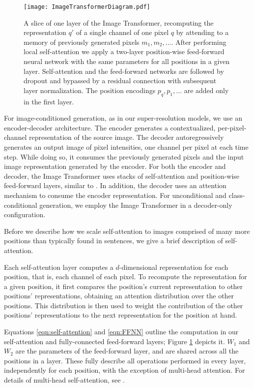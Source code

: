 \documentclass{article}
\newcommand{\modeldim}{d}
\begin{document}
\begin{figure}
  \centering
  \texttt{[image: ImageTransformerDiagram.pdf]}
  \caption{A slice of one layer of the Image Transformer, recomputing the representation $q'$ of a single channel of one pixel $q$ by attending to a memory of previously generated pixels $m_1, m_2, \ldots$. After performing local self-attention we apply a two-layer position-wise feed-forward neural network with the same parameters for all positions in a given layer. Self-attention and the feed-forward networks are followed by dropout and bypassed by a residual connection with subsequent layer normalization. The position encodings $p_q, p_1, \ldots$ are added only in the first layer.}
  \label{fig:model-arch}
\end{figure}

For image-conditioned generation, as in our super-resolution models, we use an encoder-decoder architecture. The encoder generates a contextualized, per-pixel-channel representation of the source image.
The decoder autoregressively generates an output image of pixel intensities, one channel per pixel at each time step. While doing so, it consumes the previously generated pixels and the input image representation generated by the encoder. For both the encoder and decoder, the Image Transformer uses stacks of self-attention and position-wise feed-forward layers, similar to \citep{aiayn}. In addition, the decoder uses an attention mechanism to consume the encoder representation. For unconditional and class-conditional generation, we employ the Image Transformer in a decoder-only configuration.

Before we describe how we scale self-attention to images comprised of many more positions than typically found in sentences, we give a brief description of self-attention.



Each self-attention layer computes a $\modeldim$-dimensional representation for each position, that is, each channel of each pixel. To recompute the representation for a given position, it first compares the position's current representation to other positions' representations, obtaining an attention distribution over the other positions. This distribution is then used to weight the contribution of the other positions' representations to the next representation for the position at hand.


Equations \ref{eqn:self-attention} and \ref{eqn:FFNN} outline the computation in our self-attention and fully-connected feed-forward layers; Figure \ref{fig:model-arch} depicts it. $W_1$ and $W_2$ are the parameters of the feed-forward layer, and are shared across all the positions in a layer.  These fully describe all operations performed in every layer, independently for each position, with the exception of multi-head attention. For details of multi-head self-attention, see \citep{aiayn}.
\end{document}
